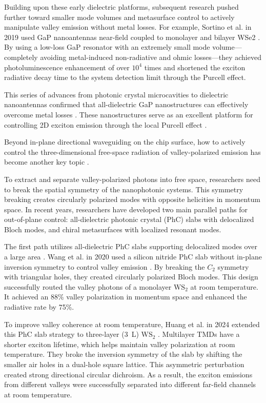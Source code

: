 Building upon these early dielectric platforms, subsequent research pushed further toward smaller mode volumes and metasurface control to actively manipulate valley emission without metal losses. For example, Sortino et al. in 2019 used GaP nanoantennas near-field coupled to monolayer and bilayer WSe2 \cite{sortino2019enhanced}. By using a low-loss GaP resonator with an extremely small mode volume---completely avoiding metal-induced non-radiative and ohmic losses---they achieved photoluminescence enhancement of over $10^4$ times and shortened the exciton radiative decay time to the system detection limit through the Purcell effect.

This series of advances from photonic crystal microcavities to dielectric nanoantennas confirmed that all-dielectric GaP nanostructures can effectively overcome metal losses \cite{gan2013controlling, Wu2014control, sortino2019enhanced}. These nanostructures serve as an excellent platform for controlling 2D exciton emission through the local Purcell effect \cite{sortino2019enhanced}.

Beyond in-plane directional waveguiding on the chip surface, how to actively control the three-dimensional free-space radiation of valley-polarized emission has become another key topic \cite{wang2020routing, rong2020photonic}.

 To extract and separate valley-polarized photons into free space, researchers need to break the spatial symmetry of the nanophotonic systems. This symmetry breaking creates circularly polarized modes with opposite helicities in momentum space. In recent years, researchers have developed two main parallel paths for out-of-plane control: all-dielectric photonic crystal (PhC) slabs with delocalized Bloch modes, and chiral metasurfaces with localized resonant modes.

The first path utilizes all-dielectric PhC slabs supporting delocalized modes over a large area \cite{wang2020routing, huang2024directing}. Wang et al. in 2020 used a silicon nitride PhC slab without in-plane inversion symmetry to control valley emission \cite{wang2020routing}. By breaking the $C_2$ symmetry with triangular holes, they created circularly polarized Bloch modes. This design successfully routed the valley photons of a monolayer $\text{WS}_2$ at room temperature. It achieved an 88\% valley polarization in momentum space and enhanced the radiative rate by 75\%.

To improve valley coherence at room temperature, Huang et al. in 2024 extended this PhC slab strategy to three-layer (3~L) $\text{WS}_2$ \cite{huang2024directing}. Multilayer TMDs have a shorter exciton lifetime, which helps maintain valley polarization at room temperature. They broke the inversion symmetry of the slab by shifting the smaller air holes in a dual-hole square lattice. This asymmetric perturbation created strong directional circular dichroism. As a result, the exciton emissions from different valleys were successfully separated into different far-field channels at room temperature.

